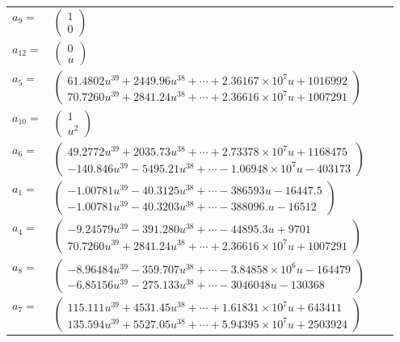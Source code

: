 \documentclass[1p]{elsarticle_modified}
\theoremstyle{definition}
\begin{document}
\begin{tabular}{m{7pt} m{180pt} m{7pt} m{180pt} }
\flushright $a_{9}=$&$\begin{pmatrix}1\\0\end{pmatrix}$ \\
\flushright $a_{12}=$&$\begin{pmatrix}0\\u\end{pmatrix}$ \\
\flushright $a_{5}=$&$\begin{pmatrix}61.4802 u^{39}+2449.96 u^{38}+\cdots+2.36167\times10^{7} u+1016992\\70.7260 u^{39}+2841.24 u^{38}+\cdots+2.36616\times10^{7} u+1007291\end{pmatrix}$ \\
\flushright $a_{10}=$&$\begin{pmatrix}1\\u^2\end{pmatrix}$ \\
\flushright $a_{6}=$&$\begin{pmatrix}49.2772 u^{39}+2035.73 u^{38}+\cdots+2.73378\times10^{7} u+1168475\\-140.846 u^{39}-5495.21 u^{38}+\cdots-1.06948\times10^{7} u-403173\end{pmatrix}$ \\
\flushright $a_{1}=$&$\begin{pmatrix}-1.00781 u^{39}-40.3125 u^{38}+\cdots-386593 u-16447.5\\-1.00781 u^{39}-40.3203 u^{38}+\cdots-388096. u-16512\end{pmatrix}$ \\
\flushright $a_{4}=$&$\begin{pmatrix}-9.24579 u^{39}-391.280 u^{38}+\cdots-44895.3 u+9701\\70.7260 u^{39}+2841.24 u^{38}+\cdots+2.36616\times10^{7} u+1007291\end{pmatrix}$ \\
\flushright $a_{8}=$&$\begin{pmatrix}-8.96484 u^{39}-359.707 u^{38}+\cdots-3.84858\times10^{6} u-164479\\-6.85156 u^{39}-275.133 u^{38}+\cdots-3046048 u-130368\end{pmatrix}$ \\
\flushright $a_{7}=$&$\begin{pmatrix}115.111 u^{39}+4531.45 u^{38}+\cdots+1.61831\times10^{7} u+643411\\135.594 u^{39}+5527.05 u^{38}+\cdots+5.94395\times10^{7} u+2503924\end{pmatrix}$ \\

\end{tabular}
\end{document}
